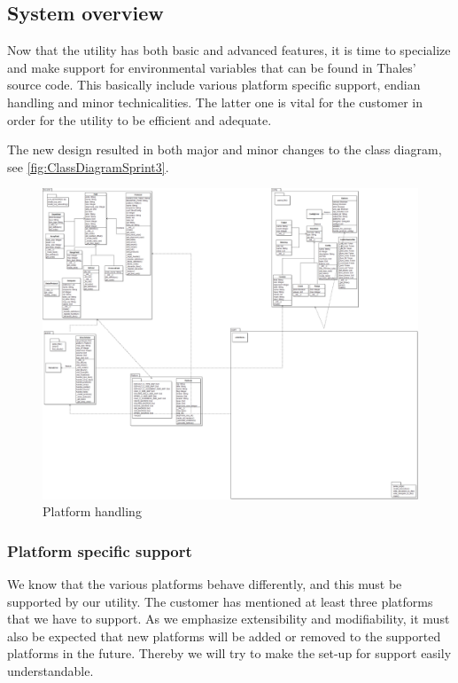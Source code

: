 \subsection{System overview}
Now that the \gls{utility} has both basic and advanced features, it is time to specialize and make support for environmental variables that can be found in Thales' source code. This basically include various platform specific support, \gls{endian} handling and minor technicalities. The latter one is vital for the customer in order for the \gls{utility} to be efficient and adequate.

The new design resulted in both major and minor changes to the class diagram, see \autoref{fig:ClassDiagramSprint3}.

\begin{figure}[!htb]
	\includegraphics[width=\textwidth]{./sprints/img/ClassDiagramSprint3}
	\caption{Platform handling\label{fig:ClassDiagramSprint3}}
\end{figure}


\subsubsection{Platform specific support}
We know that the various platforms behave differently, and this must be supported by our \gls{utility}. The customer has mentioned at least three platforms that we have to support. As we emphasize extensibility and modifiability, it must also be expected that new platforms will be added or removed to the supported platforms in the future. Thereby we will try to make the set-up for support easily understandable.

